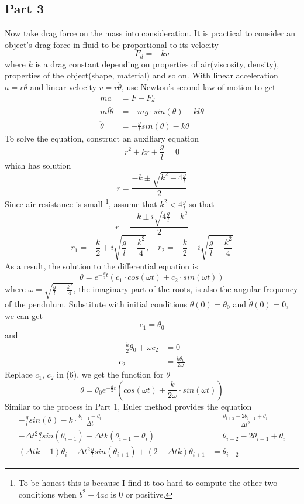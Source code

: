 \documentclass{article}
\begin{document}
\subsection{Part 3}
Now take drag force on the mass into consideration. It is practical to consider an object's drag force in fluid to be proportional to its velocity \[F_d=-kv\] where $k$ is a drag constant depending on properties of air(viscosity, density), properties of the object(shape, material) and so on. With linear acceleration $a=r\ddot{\theta}$ and linear velocity $v=r\dot{\theta}$, use Newton's second law of motion to get
\begin{align*}
    ma &= F+F_d\\
    ml\ddot{\theta} &= -mg\cdot sin(\theta)-kl\dot{\theta}\\
    \ddot{\theta} &= -\frac{g}{l}sin(\theta)-k\dot{\theta} \tag{5}
\end{align*}
To solve the equation\cite{Mohazzabi}, construct an auxiliary equation\cite{Stewart}
\[r^2+k r+\frac{g}{l}=0\]
which has solution
\[r=\frac{-k \pm \sqrt{k^2-4\frac{g}{l}}}{2}\]
Since air resistance is small \footnote{To be honest this is because I find it too hard to compute the other two conditions when $b^2-4ac$ is $0$ or positive.}, assume that $k^2<4\frac{g}{l}$ so that 
\[r=\frac{-k \pm i\sqrt{4\frac{g}{l}-k^2}}{2}\]
\[r_1=-\frac{k}{2}+i\sqrt{\frac{g}{l}-\frac{k^2}{4}},\quad r_2=-\frac{k}{2}-i\sqrt{\frac{g}{l}-\frac{k^2}{4}}\]
As a result, the solution to the differential equation is 
\[\theta=e^{-\frac{k}{2}t} (c_1\cdot cos(\omega t)+c_2 \cdot sin(\omega t)) \tag{6}\]
where $\omega=\sqrt{\frac{g}{l}-\frac{k^2}{4}}$, the imaginary part of the roots, is also the angular frequency of the pendulum. Substitute with initial conditions $\theta(0)=\theta_0$ and $\dot{\theta}(0)=0$, we can get
\[c_1=\theta_0\]
and 
\begin{align*}
    -\frac{k}{2}\theta_0+\omega c_2 &= 0\\
    c_2 &= \frac{k\theta_0}{2\omega}
\end{align*}
Replace $c_1$, $c_2$ in (6), we get the function for $\theta$
\[\theta=\theta_0 e^{-\frac{k}{2}t} (cos(\omega t)+\frac{k}{2\omega} \cdot sin(\omega t)) \tag{7}\]
Similar to the process in Part 1, Euler method provides the equation
\begin{align*}
    -\frac{g}{l}sin(\theta)-k\cdot \frac{\theta_{i+1}-\theta_i}{\Delta t} &= \frac{\theta_{i+2}-2\theta_{i+1}+\theta_i}{\Delta t^2}\\
    -\Delta t^2\frac{g}{l}sin(\theta_{i+1})-\Delta t k(\theta_{i+1}-\theta_i) &= \theta_{i+2}-2\theta_{i+1}+\theta_i\\
    (\Delta t k-1)\theta_i-\Delta t^2 \frac{g}{l}sin(\theta_{i+1})+(2-\Delta t k)\theta_{i+1} &= \theta_{i+2} \tag{8}
\end{align*}
\end{document}
